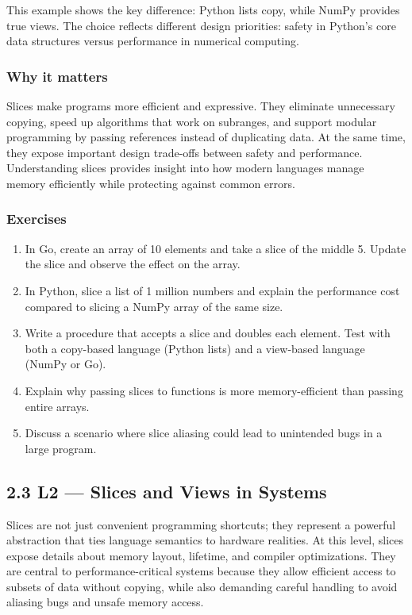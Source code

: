 \documentclass[
  letterpaper,
  DIV=11,
  numbers=noendperiod]{scrreprt}
\providecommand{\tightlist}{%
  \setlength{\itemsep}{0pt}\setlength{\parskip}{0pt}}
\begin{document}
This example shows the key difference: Python lists copy, while NumPy
provides true views. The choice reflects different design priorities:
safety in Python's core data structures versus performance in numerical
computing.

\subsubsection{Why it matters}\label{why-it-matters-19}

Slices make programs more efficient and expressive. They eliminate
unnecessary copying, speed up algorithms that work on subranges, and
support modular programming by passing references instead of duplicating
data. At the same time, they expose important design trade-offs between
safety and performance. Understanding slices provides insight into how
modern languages manage memory efficiently while protecting against
common errors.

\subsubsection{Exercises}\label{exercises-19}

\begin{enumerate}
\def\labelenumi{\arabic{enumi}.}
\tightlist
\item
  In Go, create an array of 10 elements and take a slice of the middle
  5. Update the slice and observe the effect on the array.
\item
  In Python, slice a list of 1 million numbers and explain the
  performance cost compared to slicing a NumPy array of the same size.
\item
  Write a procedure that accepts a slice and doubles each element. Test
  with both a copy-based language (Python lists) and a view-based
  language (NumPy or Go).
\item
  Explain why passing slices to functions is more memory-efficient than
  passing entire arrays.
\item
  Discuss a scenario where slice aliasing could lead to unintended bugs
  in a large program.
\end{enumerate}

\subsection{2.3 L2 --- Slices and Views in
Systems}\label{l2-slices-and-views-in-systems}

Slices are not just convenient programming shortcuts; they represent a
powerful abstraction that ties language semantics to hardware realities.
At this level, slices expose details about memory layout, lifetime, and
compiler optimizations. They are central to performance-critical systems
because they allow efficient access to subsets of data without copying,
while also demanding careful handling to avoid aliasing bugs and unsafe
memory access.
\end{document}
